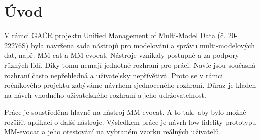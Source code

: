 \chapter*{Úvod}

V rámci GAČR projektu Unified Management of Multi-Model Data (č. 20-22276S) 
byla navržena sada nástrojů pro modelování a správu multi-modelových dat, 
např. MM-cat a MM-evocat. Nástroje vznikaly postupně a za podpory různých 
lidí. Díky tomu nemají jednotné rozhraní pro práci. Navíc jsou současná 
rozhraní často nepřehledná a uživatelsky nepřívětivá. Proto se v rámci 
ročníkového projektu zabýváme návrhem sjednoceného rozhraní. Důraz je 
kladen na návrh vhodného uživatelského rozhraní a jeho udržovatelnost.

Práce je soustředěna hlavně na nástroj MM-evocat. A to tak, aby bylo možné 
rozšířit aplikaci o další nástroje. Výsledkem práce je návrh low-fidelity 
prototypu MM-evocat a jeho otestování na vybraném vzorku reálných uživatelů.
